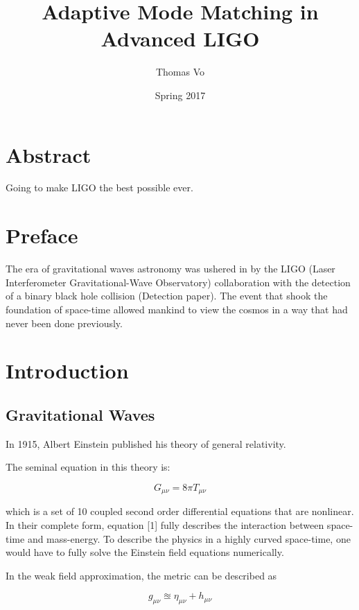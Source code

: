 \documentclass[oneside]{book}
\title{Adaptive Mode Matching in Advanced LIGO}
\date{Spring 2017}
\author{Thomas Vo}
\begin{document}
		\chapter*{Abstract}
		Going to make LIGO the best possible ever.
	
	\maketitle
		\chapter*{Preface}
		The era of gravitational waves astronomy was ushered in by the LIGO (Laser Interferometer Gravitational-Wave Observatory) collaboration with the detection of a binary black hole collision (Detection paper).  The event that shook the foundation of space-time allowed mankind to view the cosmos in a way that had never been done previously. 
	\tableofcontents

\chapter{Introduction}

	\section{Gravitational Waves}\label{gravitational waves}
	In 1915, Albert Einstein published his theory of general relativity.
	
	The seminal equation in this theory is:
	
	\begin{equation} \label{einstein}
	G_{\mu \nu} = 8 \pi T_{\mu \nu}
	\end{equation}
	
	which is a set of 10 coupled second order differential equations that are nonlinear.  In their complete form, equation [1] fully describes the interaction between space-time and mass-energy. To describe the physics in a highly curved space-time, one would have to fully solve the Einstein field equations numerically.  
	
	
	In the weak field approximation, the metric can be described as
	
	\begin{equation} \label{weak}
	g_{\mu \nu}  \approxeq \eta_{\mu \nu} + h_{\mu \nu}
	\end{equation}
	
\end{document}
